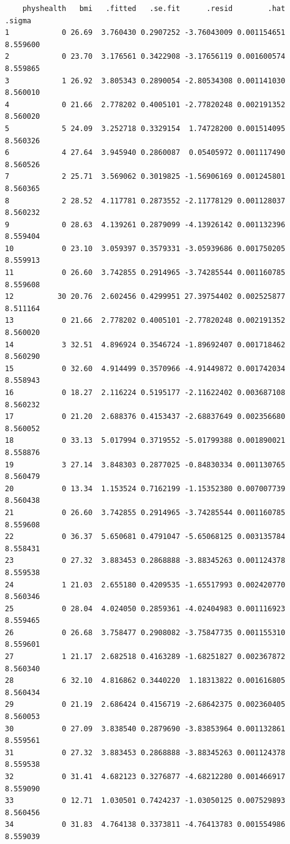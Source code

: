\documentclass[]{book}
\theoremstyle{definition}
\theoremstyle{definition}
\theoremstyle{definition}
\theoremstyle{remark}
\begin{document}
\begin{verbatim}
    physhealth   bmi   .fitted   .se.fit      .resid        .hat   .sigma
1            0 26.69  3.760430 0.2907252 -3.76043009 0.001154651 8.559600
2            0 23.70  3.176561 0.3422908 -3.17656119 0.001600574 8.559865
3            1 26.92  3.805343 0.2890054 -2.80534308 0.001141030 8.560010
4            0 21.66  2.778202 0.4005101 -2.77820248 0.002191352 8.560020
5            5 24.09  3.252718 0.3329154  1.74728200 0.001514095 8.560326
6            4 27.64  3.945940 0.2860087  0.05405972 0.001117490 8.560526
7            2 25.71  3.569062 0.3019825 -1.56906169 0.001245801 8.560365
8            2 28.52  4.117781 0.2873552 -2.11778129 0.001128037 8.560232
9            0 28.63  4.139261 0.2879099 -4.13926142 0.001132396 8.559404
10           0 23.10  3.059397 0.3579331 -3.05939686 0.001750205 8.559913
11           0 26.60  3.742855 0.2914965 -3.74285544 0.001160785 8.559608
12          30 20.76  2.602456 0.4299951 27.39754402 0.002525877 8.511164
13           0 21.66  2.778202 0.4005101 -2.77820248 0.002191352 8.560020
14           3 32.51  4.896924 0.3546724 -1.89692407 0.001718462 8.560290
15           0 32.60  4.914499 0.3570966 -4.91449872 0.001742034 8.558943
16           0 18.27  2.116224 0.5195177 -2.11622402 0.003687108 8.560232
17           0 21.20  2.688376 0.4153437 -2.68837649 0.002356680 8.560052
18           0 33.13  5.017994 0.3719552 -5.01799388 0.001890021 8.558876
19           3 27.14  3.848303 0.2877025 -0.84830334 0.001130765 8.560479
20           0 13.34  1.153524 0.7162199 -1.15352380 0.007007739 8.560438
21           0 26.60  3.742855 0.2914965 -3.74285544 0.001160785 8.559608
22           0 36.37  5.650681 0.4791047 -5.65068125 0.003135784 8.558431
23           0 27.32  3.883453 0.2868888 -3.88345263 0.001124378 8.559538
24           1 21.03  2.655180 0.4209535 -1.65517993 0.002420770 8.560346
25           0 28.04  4.024050 0.2859361 -4.02404983 0.001116923 8.559465
26           0 26.68  3.758477 0.2908082 -3.75847735 0.001155310 8.559601
27           1 21.17  2.682518 0.4163289 -1.68251827 0.002367872 8.560340
28           6 32.10  4.816862 0.3440220  1.18313822 0.001616805 8.560434
29           0 21.19  2.686424 0.4156719 -2.68642375 0.002360405 8.560053
30           0 27.09  3.838540 0.2879690 -3.83853964 0.001132861 8.559561
31           0 27.32  3.883453 0.2868888 -3.88345263 0.001124378 8.559538
32           0 31.41  4.682123 0.3276877 -4.68212280 0.001466917 8.559090
33           0 12.71  1.030501 0.7424237 -1.03050125 0.007529893 8.560456
34           0 31.83  4.764138 0.3373811 -4.76413783 0.001554986 8.559039

\end{verbatim}
\end{document}
